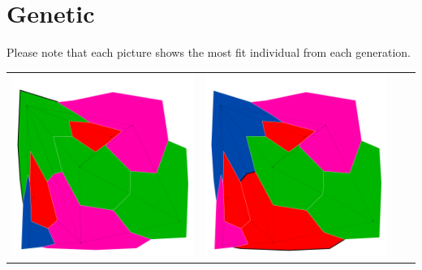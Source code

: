 \documentclass[10pt,a4paper]{article}
\begin{document}
\section{Genetic}
Please note that each picture shows the most fit individual from each generation. \\
\begin{tabular}{c c c c }
	\includegraphics[scale=.10]{../results/genetic/map_build/genetic_I00001.pdf}&
	\includegraphics[scale=.10]{../results/genetic/map_build/genetic_I00002.pdf}&

\end{tabular}
\end{document}
